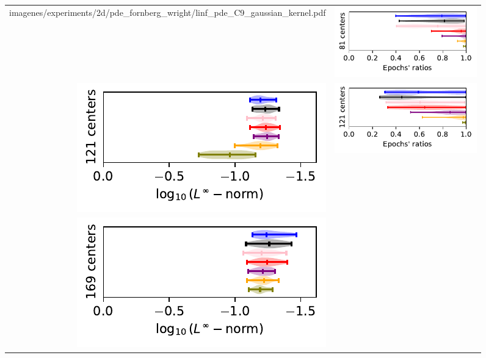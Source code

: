 \documentclass[12pt]{report} %
\begin{document}
\begin{figure}[h]
\begin{tabular}{rl}
{    {imagenes/experiments/2d/pde_fornberg_wright/linf_pde_C9_gaussian_kernel.pdf}}  & 
    {\includegraphics[width=.44\textwidth, trim={.7cm 1.15cm 0 0},clip=true]
        {imagenes/experiments/2d/pde_fornberg_wright/epochs_pde_C9_gaussian_kernel.pdf}}
    \\
    {\includegraphics[width=.5\textwidth, trim={0 1.25cm 0 0},clip=true]
    {imagenes/experiments/2d/pde_fornberg_wright/linf_pde_C11_gaussian_kernel.pdf}} & 
    {\includegraphics[width=.44\textwidth, trim={.7cm 1.15cm 0 0},clip=true]
    {imagenes/experiments/2d/pde_fornberg_wright/epochs_pde_C11_gaussian_kernel.pdf}}                                                                                     \\
    {\includegraphics[width=.5\textwidth, trim={0 1.25cm 0 0},clip=true]
    {imagenes/experiments/2d/pde_fornberg_wright/linf_pde_C13_gaussian_kernel.pdf}} & 
    {\includegraphics[width=.44\textwidth, trim={.7cm 1.15cm 0 0},clip=true]
}
\end{tabular}
\end{figure}
\end{document}
